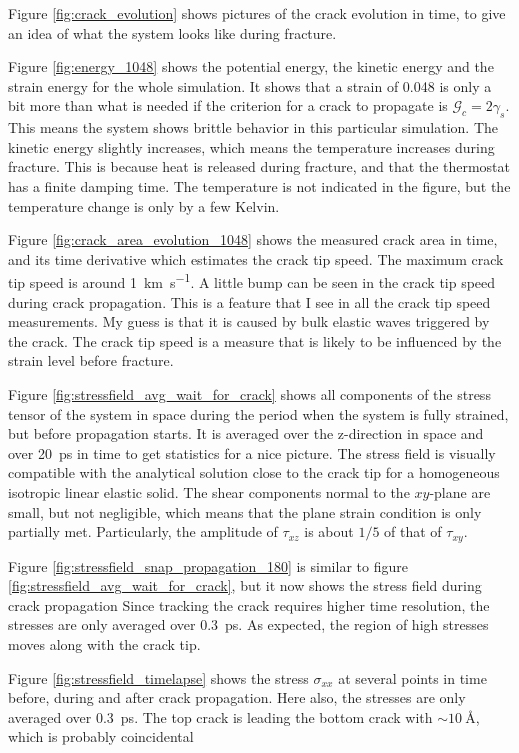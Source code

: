 Figure \ref{fig:crack_evolution} shows pictures of the crack evolution in time, to give an idea of what the system looks like during fracture. 

Figure \ref{fig:energy_1048} shows the potential energy, the kinetic energy and the strain energy for the whole simulation. It shows that a strain of 0.048 is only a bit more than what is needed if the criterion for a crack to propagate is $\mathcal{G}_c = 2\gamma_s$. This means the system shows brittle behavior in this particular simulation. The kinetic energy slightly increases, which means the temperature increases during fracture. This is because heat is released during fracture, and that the thermostat has a finite damping time. The temperature is not indicated in the figure, but the temperature change is only by a few Kelvin. 


Figure \ref{fig:crack_area_evolution_1048} shows the measured crack area in time, and its time derivative which estimates the crack tip speed. The maximum crack tip speed is around \SI{1}{\kilo\meter\per\second}. A little bump can be seen in the crack tip speed during crack propagation. This is a feature that I see in all the crack tip speed measurements. My guess is that it is caused by bulk elastic waves triggered by the crack. The crack tip speed is a measure that is likely to be influenced by the strain level before fracture. 

Figure \ref{fig:stressfield_avg_wait_for_crack} shows all components of the stress tensor of the system in space during the period when the system is fully strained, but before propagation starts. It is averaged over the z-direction in space and over \SI{20}{\pico\second} in time to get statistics for a nice picture. The stress field is visually compatible with the analytical solution close to the crack tip for a homogeneous isotropic linear elastic solid. The shear components normal to the $xy$-plane are small, but not negligible, which means that the plane strain condition is only partially met. Particularly, the amplitude of $\tau_{xz}$ is about $1/5$ of that of $\tau_{xy}$. 

Figure \ref{fig:stressfield_snap_propagation_180} is similar to figure \ref{fig:stressfield_avg_wait_for_crack}, but it now shows the stress field during crack propagation Since tracking the crack requires higher time resolution, the stresses are only averaged over \SI{0.3}{\pico\second}. As expected, the region of high stresses moves along with the crack tip.

Figure \ref{fig:stressfield_timelapse} shows the stress $\sigma_{xx}$ at several points in time before, during and after crack propagation. Here also, the stresses are only averaged over \SI{0.3}{\pico\second}. The top crack is leading the bottom crack with $\sim \SI{10}{\angstrom}$, which is probably coincidental


